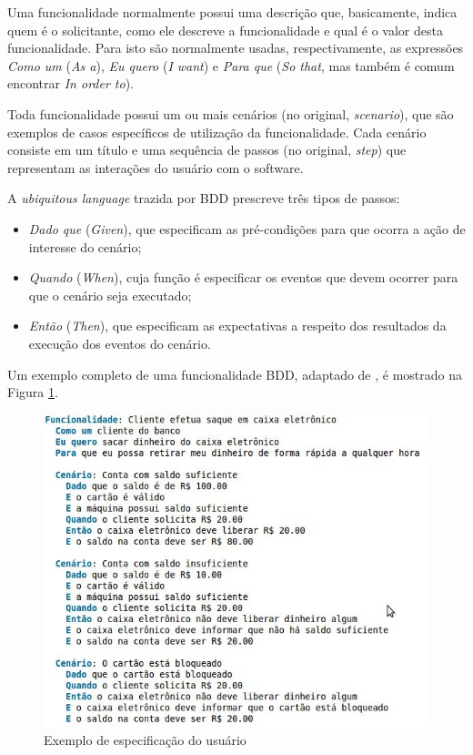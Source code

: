 \documentclass[a4paper,abntfigtabnum,noindentfirst]{abnt}
\begin{document}
Uma funcionalidade normalmente possui uma descrição que, basicamente, indica quem é o solicitante, como ele descreve a funcionalidade e qual é o valor desta funcionalidade. Para isto são normalmente usadas, respectivamente, as expressões \textit{Como um} (\textit{As a}), \textit{Eu quero} (\textit{I want}) e \textit{Para que} (\textit{So that}, mas também é comum encontrar \textit{In order to}).

Toda funcionalidade possui um ou mais cenários (no original, \textit{scenario}), que são exemplos de casos específicos de utilização da funcionalidade. Cada cenário consiste em um título e uma sequência de passos (no original, \textit{step}) que representam as interações do usuário com o software.

A \textit{ubiquitous language} trazida por BDD prescreve três tipos de passos:
\begin{itemize}

\item \textit{Dado que} (\textit{Given}), que especificam as pré-condições para que ocorra a ação de interesse do cenário;
\item \textit{Quando} (\textit{When}), cuja função é especificar os eventos que devem ocorrer para que o cenário seja executado;
\item \textit{Então} (\textit{Then}), que especificam as expectativas a respeito dos resultados da execução dos eventos do cenário.
\end{itemize}

Um exemplo completo de uma funcionalidade BDD, adaptado de , é mostrado na Figura \ref{exemplo-de-funcionalidade}.

\begin{figure}
	\caption{Exemplo de especificação do usuário}
	\label{exemplo-de-funcionalidade}
	\includegraphics[scale=0.7]{exemplo-de-funcionalidade-bdd}
\end{figure}
\end{document}
